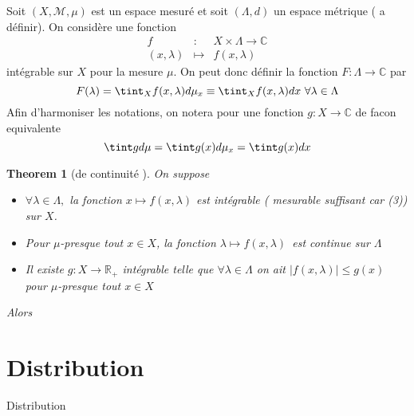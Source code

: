 \documentclass[3pt]{article}
\newtheorem{theorem}{Theorem}
\begin{document}
Soit $(X,\mathcal{M},\mu )$ est un espace mesur\'{e} et soit $(\Lambda ,d)$
un espace m\'{e}trique ( a d\'{e}finir). On consid\`{e}re une fonction 
\begin{eqnarray*}
f &:&X\times \Lambda \rightarrow \mathbb{C} \\
(x,\lambda ) &\longmapsto &f(x,\lambda )
\end{eqnarray*}%
int\'{e}grable sur $X$ pour la mesure $\mu .$ On peut donc d\'{e}finir la
fonction $F:\Lambda \rightarrow \mathbb{C}$ par%
\begin{equation*}
F(\lambda )=\tint_{X}f(x,\lambda )d\mu _{x}\equiv \tint_{X}f(x,\lambda )dx%
\text{ }\forall \lambda \in \Lambda 
\end{equation*}%
Afin d'harmoniser les notations, on notera pour une fonction $g:X\rightarrow 
\mathbb{C}$ de facon equivalente 
\begin{equation*}
\tint gd\mu =\tint g(x)d\mu _{x}=\tint g(x)dx
\end{equation*}

\bigskip 

\begin{theorem}[de continuit\'{e} ]
On suppose

\begin{itemize}
\item $\forall \lambda \in \Lambda ,$ la fonction $x\longmapsto f(x,\lambda )
$ est int\'{e}grable ( mesurable suffisant car (3)) sur $X$.

\item Pour $\mu $-presque tout $x\in X$, la fonction $\lambda \longmapsto
f(x,\lambda )$\ est continue sur $\Lambda $

\item Il existe $g:X\rightarrow \mathbb{R}_{+}$ int\'{e}grable telle que $%
\forall \lambda \in \Lambda $ on ait $\left\vert f(x,\lambda )\right\vert
\leq g(x)$ pour  $\mu $-presque tout $x\in X$
\end{itemize}
Alors
\end{theorem}

\section{Distribution}

Distribution

\bigskip
\end{document}
